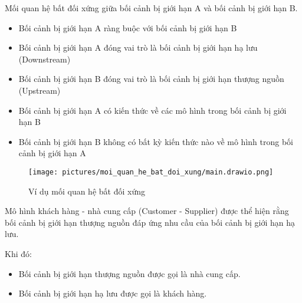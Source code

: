 \begin{example} Mối quan hệ bất đối xứng giữa bối cảnh bị giới hạn A và bối cảnh bị giới hạn B.

    \begin{itemize}

        \item Bối cảnh bị giới hạn A ràng buộc với bối cảnh bị giới hạn B

        \item Bối cảnh bị giới hạn A đóng vai trò là bối cảnh bị giới hạn hạ lưu (Downstream)

        \item Bối cảnh bị giới hạn B đóng vai trò là bối cảnh bị giới hạn thượng nguồn (Upstream)

        \item Bối cảnh bị giới hạn A có kiến thức về các mô hình trong bối cảnh bị giới hạn B

        \item Bối cảnh bị giới hạn B không có bất kỳ kiến thức nào về mô hình trong bối cảnh bị giới hạn A

    \end{itemize}

    \begin{figure}[H]

        \centering

        \texttt{[image: pictures/moi\_quan\_he\_bat\_doi\_xung/main.drawio.png]}

        \caption{Ví dụ mối quan hệ bất đối xứng}

    \end{figure}

\end{example}


Mô hình khách hàng - nhà cung cấp (Customer - Supplier) được thể hiện rằng bối cảnh bị giới hạn thượng nguồn đáp ứng nhu cầu của bối cảnh bị giới hạn hạ lưu.

Khi đó:

\begin{itemize}

    \item Bối cảnh bị giới hạn thượng nguồn được gọi là nhà cung cấp.

    \item Bối cảnh bị giới hạn hạ lưu được gọi là khách hàng.

\end{itemize}


